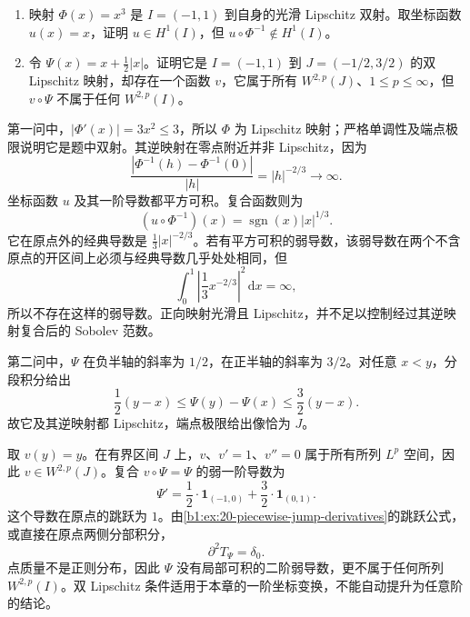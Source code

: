 \begin{optionalexercise}\label{b1:ex:21-coordinate-change-boundaries}
\begin{enumerate}
\item\label{b1:item:21-inverse-lipschitz-required}
映射 \(\Phi(x)=x^3\) 是 \(I=(-1,1)\) 到自身的光滑 Lipschitz 双射。取坐标函数 \(u(x)=x\)，证明 \(u\in H^1(I)\)，但 \(u\circ\Phi^{-1}\notin H^1(I)\)。
\item\label{b1:item:21-bilipschitz-not-second-order}
令 \(\Psi(x)=x+\tfrac12|x|\)。证明它是 \(I=(-1,1)\) 到 \(J=(-1/2,3/2)\) 的双 Lipschitz 映射，却存在一个函数 \(v\)，它属于所有 \(W^{2,p}(J)\)、\(1\le p\le\infty\)，但 \(v\circ\Psi\) 不属于任何 \(W^{2,p}(I)\)。
\end{enumerate}
\end{optionalexercise}
\begin{solution}
第一问中，\(|\Phi'(x)|=3x^2\le3\)，所以 \(\Phi\) 为 Lipschitz 映射；严格单调性及端点极限说明它是题中双射。其逆映射在零点附近并非 Lipschitz，因为
\[
 \frac{|\Phi^{-1}(h)-\Phi^{-1}(0)|}{|h|}=|h|^{-2/3}\longrightarrow\infty.
\]
坐标函数 \(u\) 及其一阶导数都平方可积。复合函数则为
\[
 (u\circ\Phi^{-1})(x)=\operatorname{sgn}(x)|x|^{1/3}.
\]
它在原点外的经典导数是 \(\tfrac13|x|^{-2/3}\)。若有平方可积的弱导数，该弱导数在两个不含原点的开区间上必须与经典导数几乎处处相同，但
\[
 \int_0^1\left|\frac13x^{-2/3}\right|^2\,\mathrm dx=\infty,
\]
所以不存在这样的弱导数。正向映射光滑且 Lipschitz，并不足以控制经过其逆映射复合后的 Sobolev 范数。

第二问中，\(\Psi\) 在负半轴的斜率为 \(1/2\)，在正半轴的斜率为 \(3/2\)。对任意 \(x<y\)，分段积分给出
\[
 \frac12(y-x)\le\Psi(y)-\Psi(x)\le\frac32(y-x).
\]
故它及其逆映射都 Lipschitz，端点极限给出像恰为 \(J\)。

取 \(v(y)=y\)。在有界区间 \(J\) 上，\(v\)、\(v'=1\)、\(v''=0\) 属于所有所列 \(L^p\) 空间，因此 \(v\in W^{2,p}(J)\)。复合 \(v\circ\Psi=\Psi\) 的弱一阶导数为
\[
 \Psi'=\frac12\cdot\mathbf1_{(-1,0)}+\frac32\cdot\mathbf1_{(0,1)}.
\]
这个导数在原点的跳跃为 \(1\)。由\cref{b1:ex:20-piecewise-jump-derivatives}的跳跃公式，或直接在原点两侧分部积分，
\[
 \partial^2T_\Psi=\delta_0.
\]
点质量不是正则分布，因此 \(\Psi\) 没有局部可积的二阶弱导数，更不属于任何所列 \(W^{2,p}(I)\)。双 Lipschitz 条件适用于本章的一阶坐标变换，不能自动提升为任意阶的结论。
\end{solution}

